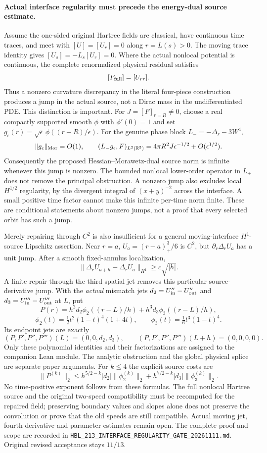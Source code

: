 
\paragraph{Actual interface regularity must precede the energy-dual source estimate.}
Assume the one-sided original Hartree fields are classical, have
continuous time traces, and meet with $[U]=[U_r]=0$ along $r=L(s)>0$.
The moving trace identity gives $[U_s]=-L_s[U_r]=0$.
Where the actual nonlocal potential is continuous, the complete
renormalized physical residual satisfies
\[
 [F_{\rm full}]=[U_{rr}].
\]
Thus a nonzero curvature discrepancy in the literal four-piece
construction produces a jump in the actual source, not a Dirac
mass in the undifferentiated PDE. This distinction is important.
For $J=[F]_{r=R}\ne0$, choose a real compactly supported smooth
$\phi$ with $\phi'(0)=1$ and set
$g_\epsilon(r)=\sqrt\epsilon\,\phi((r-R)/\epsilon)$.
For the genuine phase block $L_-=-\Delta_r-3W^4$,
\[
 \|g_\epsilon\|_{\rm Mor}=O(1),\qquad
 (L_-g_\epsilon,F)_{L^2(\mathbb R^3)}
   =4\pi R^2J\epsilon^{-1/2}+O(\epsilon^{1/2}).
\]
Consequently the proposed Hessian--Morawetz-dual source norm is
infinite whenever this jump is nonzero. The bounded nonlocal
lower-order operator in $L_+$ does not remove the principal
obstruction. A nonzero jump also excludes local $H^{1/2}$
regularity, by the divergent integral of $(x+y)^{-2}$ across the
interface. A small positive time factor cannot make this infinite
per-time norm finite. These are conditional statements about
nonzero jumps, not a proof that every selected orbit has such a jump.

Merely repairing through $C^2$ is also insufficient for a general
moving-interface $H^1$-source Lipschitz assertion. Near $r=a$,
$U_a=(r-a)_+^3/6$ is $C^2$, but
$\partial_r\Delta_rU_a$ has a unit jump. After a smooth fixed-annulus
localization,
\[
 \|\Delta_r U_{a+h}-\Delta_r U_a\|_{H^1}\ge c\sqrt{|h|}.
\]
A finite repair through the third spatial jet removes this
particular source-derivative jump. With the \emph{actual} mismatch
jets $d_2=U_{\rm in}''-U_{\rm out}''$ and
$d_3=U_{\rm in}'''-U_{\rm out}'''$ at $L$, put
\[
 P(r)=h^2d_2\phi_2((r-L)/h)+h^3d_3\phi_3((r-L)/h),
\]
\[
 \phi_2(t)=\tfrac12t^2(1-t)^4(1+4t),\qquad
 \phi_3(t)=\tfrac16t^3(1-t)^4.
\]
Its endpoint jets are exactly
\[
 (P,P',P'',P''')(L)=(0,0,d_2,d_3),\qquad
 (P,P',P'',P''')(L+h)=(0,0,0,0).
\]
Only these polynomial identities and their factorizations are
assigned to the companion Lean module. The analytic obstruction
and the global physical splice are separate paper arguments.
For $k\le4$ the explicit source costs are
\[
 \|P^{(k)}\|_2\le
 h^{5/2-k}|d_2|\|\phi_2^{(k)}\|_2+
 h^{7/2-k}|d_3|\|\phi_3^{(k)}\|_2.
\]
No time-positive exponent follows from these formulas.
The full nonlocal Hartree source and the original two-speed
compatibility must be recomputed for the repaired field; preserving
boundary values and slopes alone does not preserve the convolution
or prove that the old speeds are still compatible. Actual moving
jet, fourth-derivative and parameter estimates remain open.
The complete proof and scope are recorded in
\texttt{HBL\_213\_INTERFACE\_REGULARITY\_GATE\_20261111.md}.
Original revised acceptance stays $11/13$.
